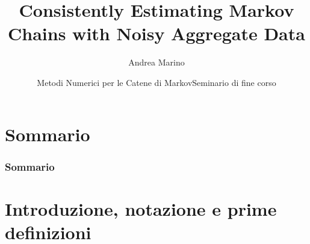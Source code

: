 \documentclass[10pt,xcolor={table,dvipsnames}]{beamer} 		%
\title[Seminario MNCM]{Consistently Estimating Markov Chains with Noisy Aggregate Data}			%
\author{Andrea Marino}
\institute[DI UniPi]{Università di Pisa}
\date[\today]{Metodi Numerici per le Catene di Markov\newline Seminario di fine corso}
\theoremstyle{plain}					%
\theoremstyle{definition}
\theoremstyle{remark}
\begin{document}
	\begin{frame}[plain]
		\titlepage
	\end{frame}
	
\section*{Sommario}
	\setcounter{tocdepth}{1}
	\begin{frame}
		\frametitle{Sommario}
		\tableofcontents
	\end{frame}
	
	\setcounter{tocdepth}{2}

\section{Introduzione, notazione e prime definizioni}
\end{document}
